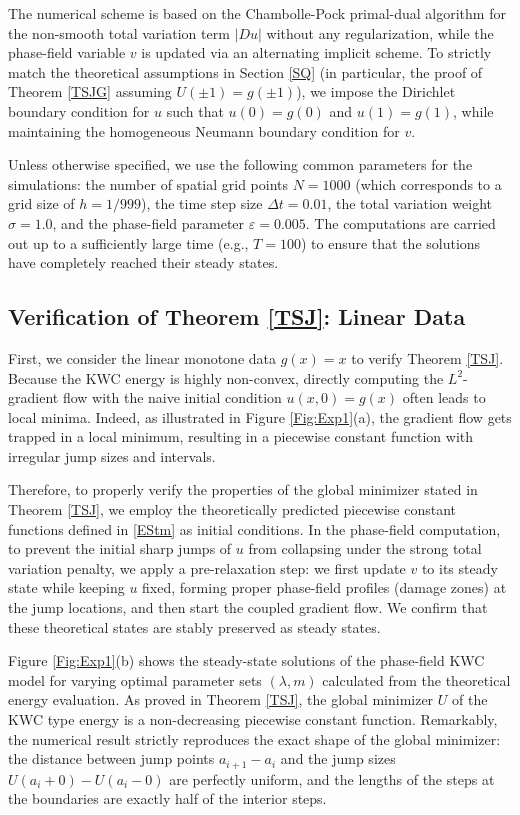 \documentclass[12pt, reqno]{amsart}
\numberwithin{equation}{section}
\begin{document}
The numerical scheme is based on the Chambolle-Pock primal-dual algorithm for the non-smooth total variation term $|Du|$ without any regularization, while the phase-field variable $v$ is updated via an alternating implicit scheme. 
To strictly match the theoretical assumptions in Section \ref{SQ} (in particular, the proof of Theorem \ref{TSJG} assuming $U(\pm 1) = g(\pm 1)$), we impose the Dirichlet boundary condition for $u$ such that $u(0)=g(0)$ and $u(1)=g(1)$, while maintaining the homogeneous Neumann boundary condition for $v$.

Unless otherwise specified, we use the following common parameters for the simulations: the number of spatial grid points $N=1000$ (which corresponds to a grid size of $h=1/999$), the time step size $\Delta t = 0.01$, the total variation weight $\sigma = 1.0$, and the phase-field parameter $\varepsilon = 0.005$. The computations are carried out up to a sufficiently large time (e.g., $T=100$) to ensure that the solutions have completely reached their steady states.

\subsection{Verification of Theorem \ref{TSJ}: Linear Data}
First, we consider the linear monotone data $g(x) = x$ to verify Theorem \ref{TSJ}. 
Because the KWC energy is highly non-convex, directly computing the $L^2$-gradient flow with the naive initial condition $u(x,0) = g(x)$ often leads to local minima. 
Indeed, as illustrated in Figure \ref{Fig:Exp1}(a), the gradient flow gets trapped in a local minimum, resulting in a piecewise constant function with irregular jump sizes and intervals.

Therefore, to properly verify the properties of the global minimizer stated in Theorem \ref{TSJ}, we employ the theoretically predicted piecewise constant functions defined in \eqref{EStm} as initial conditions.
In the phase-field computation, to prevent the initial sharp jumps of $u$ from collapsing under the strong total variation penalty, we apply a pre-relaxation step: we first update $v$ to its steady state while keeping $u$ fixed, forming proper phase-field profiles (damage zones) at the jump locations, and then start the coupled gradient flow.
We confirm that these theoretical states are stably preserved as steady states.

Figure \ref{Fig:Exp1}(b) shows the steady-state solutions of the phase-field KWC model for varying optimal parameter sets $(\lambda, m)$ calculated from the theoretical energy evaluation.
As proved in Theorem \ref{TSJ}, the global minimizer $U$ of the KWC type energy is a non-decreasing piecewise constant function. 
Remarkably, the numerical result strictly reproduces the exact shape of the global minimizer: the distance between jump points $a_{i+1}-a_i$ and the jump sizes $U(a_i+0)-U(a_i-0)$ are perfectly uniform, and the lengths of the steps at the boundaries are exactly half of the interior steps.
\end{document}
